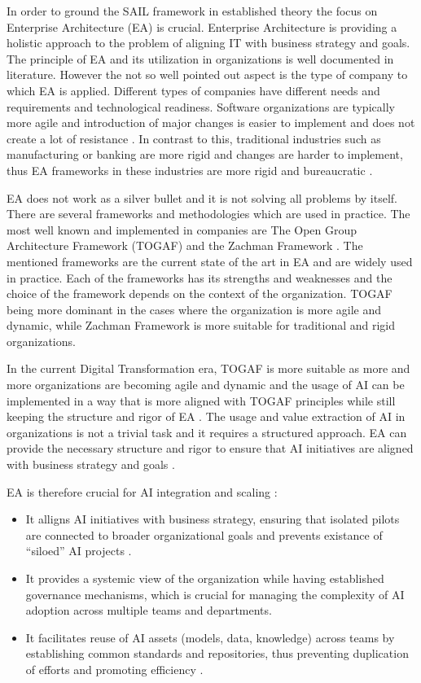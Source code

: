 \documentclass[]{imc-inf}
\begin{document}
In order to ground the SAIL framework in established theory the focus on
Enterprise Architecture (EA) is crucial. Enterprise Architecture is
providing a holistic approach to the problem of aligning IT with
business strategy and goals. The principle of EA and its utilization in
organizations is well documented in literature. However the
not so well pointed out aspect is the type of company to which EA is
applied. Different types of companies have different needs and
requirements and technological readiness. Software organizations are
typically more agile and introduction of major changes is easier to
implement and does not create a lot of resistance \citep{Kaddoumi2022}. In contrast to this,
traditional industries such as manufacturing or banking are more rigid
and changes are harder to implement, thus EA frameworks in these
industries are more rigid and bureaucratic \citep{Canat2018}.

EA does not work as a silver bullet and it is not solving all problems
by itself. There are several frameworks and methodologies which are used
in practice. The most well known and implemented in companies are
The Open Group Architecture Framework (TOGAF) \citep{TheOpenGroup2022} and the Zachman
Framework \citep{Zachman1987}. The mentioned frameworks are the current state of the art in
EA and are widely used in practice. Each of the frameworks has its
strengths and weaknesses and the choice of the framework depends on the
context of the organization. TOGAF being more dominant in the cases
where the organization is more agile and dynamic, while Zachman
Framework is more suitable for traditional and rigid organizations.

In the current Digital Transformation era, TOGAF is more suitable as
more and more organizations are becoming agile and dynamic and the usage
of AI can be implemented in a way that is more aligned with TOGAF
principles while still keeping the structure and rigor of EA \citep{Fitriani2023}. The usage
and value extraction of AI in organizations is not a trivial task and it
requires a structured approach. EA can provide the necessary structure
and rigor to ensure that AI initiatives are aligned with business
strategy and goals \citep{Ern2025}.

EA is therefore crucial for AI integration and scaling :

\begin{itemize}
	\item
	It alligns AI initiatives with business strategy, ensuring that
	isolated pilots are connected to broader organizational goals and
	prevents existance of ``siloed'' AI projects \citep{McKinsey2024b}.
	\item
	It provides a systemic view of the organization while having
	established governance mechanisms, which is crucial for managing the
	complexity of AI adoption across multiple teams and departments.
	\item
	It facilitates reuse of AI assets (models, data, knowledge) across
	teams by establishing common standards and repositories, thus
	preventing duplication of efforts and promoting efficiency \citep{Lakarasu2022}.
\end{itemize}
\end{document}
